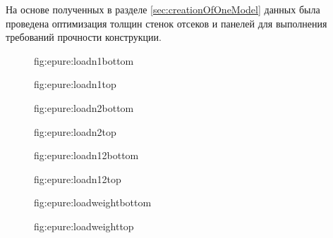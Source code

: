 На основе полученных в разделе \ref{sec:creationOfOneModel} данных была проведена оптимизация толщин стенок отсеков и панелей для выполнения требований прочности конструкции. 

\begin{figure}
	\centering
	\def\svgwidth{\textwidth}
	
	\label{fig:epure:loadn1bottom}
	\caption{fig:epure:loadn1bottom}
\end{figure}

\begin{figure}
	\centering
	\def\svgwidth{\textwidth}
	
	\label{fig:epure:loadn1top}
	\caption{fig:epure:loadn1top}
\end{figure}

\begin{figure}
	\centering
	\def\svgwidth{\textwidth}
	
	\label{fig:epure:loadn2bottom}
	\caption{fig:epure:loadn2bottom}
\end{figure}

\begin{figure}
	\centering
	\def\svgwidth{\textwidth}
	
	\label{fig:epure:loadn2top}
	\caption{fig:epure:loadn2top}
\end{figure}

\begin{figure}
	\centering
	\def\svgwidth{\textwidth}
	
	\label{fig:epure:loadn12bottom}
	\caption{fig:epure:loadn12bottom}
\end{figure}

\begin{figure}
	\centering
	\def\svgwidth{\textwidth}
	
	\label{fig:epure:loadn12top}
	\caption{fig:epure:loadn12top}
\end{figure}

\begin{figure}
	\centering
	\def\svgwidth{\textwidth}
	
	\label{fig:epure:loadweightbottom}
	\caption{fig:epure:loadweightbottom}
\end{figure}

\begin{figure}
	\centering
	\def\svgwidth{\textwidth}
	
	\label{fig:epure:loadweighttop}
	\caption{fig:epure:loadweighttop}
\end{figure}

